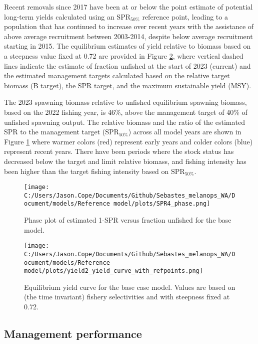 \documentclass[11pt,
  english,
  letterpaper,
]{article}
\begin{document}
Recent removals since 2017 have been at or below the point estimate of potential long-term yields calculated using an \(\text{SPR}_{50\%}\) reference point, leading to a population that has continued to increase over recent years with the assistance of above average recruitment between 2003-2014, despite below average recruitment starting in 2015. The equilibrium estimates of yield relative to biomass based on a steepness value fixed at 0.72 are provided in Figure \ref{fig:es-yield}, where vertical dashed lines indicate the estimate of fraction unfished at the start of 2023 (current) and the estimated management targets calculated based on the relative target biomass (B target), the SPR target, and the maximum sustainable yield (MSY).

The 2023 spawning biomass relative to unfished equilibrium spawning biomass, based on the 2022 fishing year, is 46\%, above the management target of 40\% of unfished spawning output. The relative biomass and the ratio of the estimated SPR to the management target (\(\text{SPR}_{50\%}\)) across all model years are shown in Figure \ref{fig:es-phase} where warmer colors (red) represent early years and colder colors (blue) represent recent years. There have been periods where the stock status has decreased below the target and limit relative biomass, and fishing intensity has been higher than the target fishing intensity based on \(\text{SPR}_{50\%}\).



\begin{figure}
\centering
\texttt{[image: C:/Users/Jason.Cope/Documents/Github/Sebastes\_melanops\_WA/Document/models/Reference model/plots/SPR4\_phase.png]}
\caption{Phase plot of estimated 1-SPR versus fraction unfished for the base model.\label{fig:es-phase}}
\end{figure}

\begin{figure}
\centering
\texttt{[image: C:/Users/Jason.Cope/Documents/Github/Sebastes\_melanops\_WA/Document/models/Reference model/plots/yield2\_yield\_curve\_with\_refpoints.png]}
\caption{Equilibrium yield curve for the base case model. Values are based on (the time invariant) fishery selectivities and with steepness fixed at 0.72.\label{fig:es-yield}}
\end{figure}

\clearpage

\hypertarget{management-performance}{%
\subsection*{Management performance}\label{management-performance}}
\end{document}
